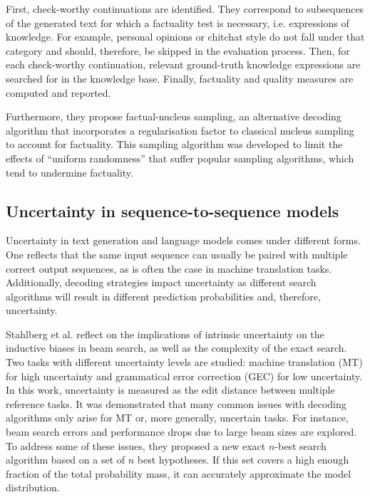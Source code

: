 First, check-worthy continuations are identified. They correspond to subsequences of the generated text for which a factuality test is necessary, i.e. expressions of knowledge. For example, personal opinions or chitchat style do not fall under that category and should, therefore, be skipped in the evaluation process. Then, for each check-worthy continuation, relevant ground-truth knowledge expressions are searched for in the knowledge base. Finally, factuality and quality measures are computed and reported.

Furthermore, they propose factual-nucleus sampling, an alternative decoding algorithm that incorporates a regularisation factor to classical nucleus sampling to account for factuality. This sampling algorithm was developed to limit the effects of “uniform randomness” that suffer popular sampling algorithms, which tend to undermine factuality.

\subsection{Uncertainty in sequence-to-sequence models}

Uncertainty in text generation and language models comes under different forms. One reflects that the same input sequence can usually be paired with multiple correct output sequences, as is often the case in machine translation tasks. Additionally, decoding strategies impact uncertainty as different search algorithms will result in different prediction probabilities and, therefore, uncertainty. 

Stahlberg et al.\cite{uncertaintyNLPandDecoding} reflect on the implications of intrinsic uncertainty on the inductive biases in beam search, as well as the complexity of the exact search. Two tasks with different uncertainty levels are studied:  machine  translation  (MT) for high uncertainty and  grammatical  error  correction  (GEC) for low uncertainty. 
In this work, uncertainty is measured as the edit distance between multiple reference tasks. It was demonstrated that many common issues with decoding algorithms only arise for MT or, more generally, uncertain tasks. For instance, beam search errors and performance drops due to large beam sizes are explored. To address some of these issues, they proposed a new exact $n$-best search algorithm based on a set of $n$ best hypotheses. If this set covers a high enough fraction of the total probability mass, it can accurately approximate the model distribution.
